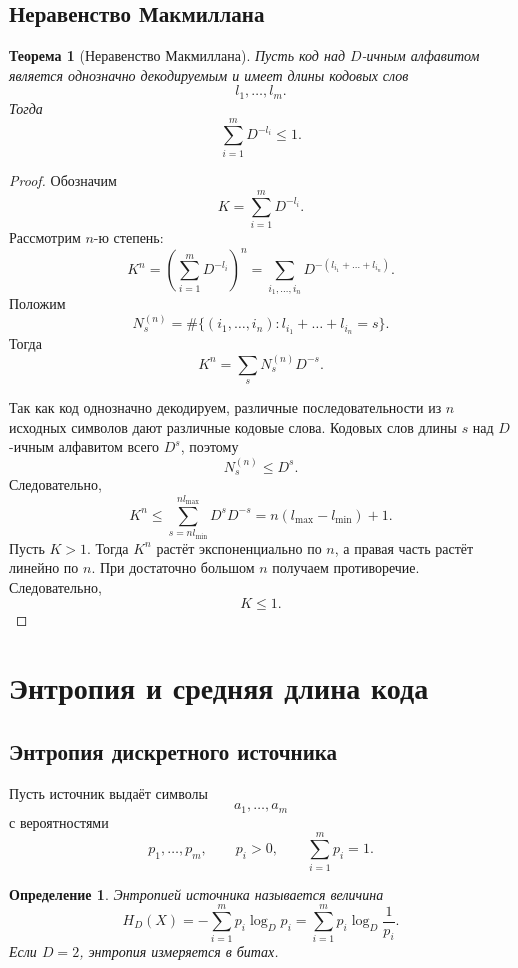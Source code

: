 \documentclass[12pt,a4paper]{article}
\newtheorem{definition}{Определение}[section]
\newtheorem{theorem}{Теорема}[section]
\begin{document}
\subsection{Неравенство Макмиллана}

\begin{theorem}[Неравенство Макмиллана]
Пусть код над $D$-ичным алфавитом является однозначно декодируемым и имеет длины кодовых слов
\[
    l_1,\dots,l_m.
\]
Тогда
\[
    \sum_{i=1}^{m} D^{-l_i} \le 1.
\]
\end{theorem}

\begin{proof}
Обозначим
\[
    K=\sum_{i=1}^{m}D^{-l_i}.
\]
Рассмотрим $n$-ю степень:
\[
    K^n
    =
    \left(\sum_{i=1}^{m}D^{-l_i}\right)^n
    =
    \sum_{i_1,\dots,i_n}
    D^{-(l_{i_1}+\dots+l_{i_n})}.
\]
Положим
\[
    N_s^{(n)}=
    \#\{(i_1,\dots,i_n):l_{i_1}+\dots+l_{i_n}=s\}.
\]
Тогда
\[
    K^n=\sum_s N_s^{(n)}D^{-s}.
\]

Так как код однозначно декодируем, различные последовательности из $n$ исходных символов дают различные кодовые слова.
Кодовых слов длины $s$ над $D$-ичным алфавитом всего $D^s$, поэтому
\[
    N_s^{(n)}\le D^s.
\]
Следовательно,
\[
    K^n
    \le
    \sum_{s=n l_{\min}}^{n l_{\max}}D^sD^{-s}
    =
    n(l_{\max}-l_{\min})+1.
\]
Пусть $K>1$.
Тогда $K^n$ растёт экспоненциально по $n$, а правая часть растёт линейно по $n$.
При достаточно большом $n$ получаем противоречие.
Следовательно,
\[
    K\le 1.
\]
\end{proof}

\section{Энтропия и средняя длина кода}

\subsection{Энтропия дискретного источника}

Пусть источник выдаёт символы
\[
    a_1,\dots,a_m
\]
с вероятностями
\[
    p_1,\dots,p_m,\qquad p_i>0,\qquad \sum_{i=1}^{m}p_i=1.
\]

\begin{definition}
Энтропией источника называется величина
\[
    H_D(X)
    =
    -\sum_{i=1}^{m}p_i\log_D p_i
    =
    \sum_{i=1}^{m}p_i\log_D\frac1{p_i}.
\]
Если $D=2$, энтропия измеряется в битах.
\end{definition}
\end{document}
